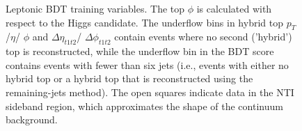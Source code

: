 \begin{figure}[htbp]
  \caption{Leptonic BDT training variables. The top $\phi$ is calculated with respect to the Higgs candidate. The underflow bins in hybrid top $p_{T}$/$\eta$/ $\phi$ and $\Delta\eta_{t1t2}$/ $\Delta\phi_{t1t2}$ contain events where no second ('hybrid') top is reconstructed, while the underflow bin in the BDT score contains events with fewer than six jets (i.e., events with either no hybrid top or a hybrid top that is reconstructed using the remaining-jets method). The open squares indicate data in the NTI sideband region, which approximates the shape of the continuum background. }
  \label{fig:lepvbls2}
\end{figure}

